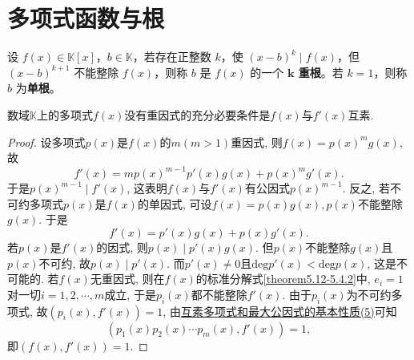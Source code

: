 \documentclass[../../main.tex]{subfiles}%
\begin{document}
\section{多项式函数与根}

\begin{definition}[多项式的重根]\label{definition:多项式的重根}
设 $f(x) \in \mathbb{K}[x]$，$b \in \mathbb{K}$，若存在正整数 $k$，使 $(x - b)^k \mid f(x)$，但 $(x - b)^{k+1}$ 不能整除 $f(x)$，则称 $b$ 是 $f(x)$ 的一个 \textbf{$\boldsymbol{k}$ 重根}。若 $k = 1$，则称 $b$ 为\textbf{单根}。
\end{definition}

\begin{theorem}[多项式没有重因式的充要条件]\label{theorem:多项式没有重因式的充要条件}
数域\(\mathbb{K}\)上的多项式\(f(x)\)没有重因式的充分必要条件是\(f(x)\)与\(f'(x)\)互素.
\end{theorem}
\begin{proof}

设多项式\(p(x)\)是\(f(x)\)的\(m(m > 1)\)重因式, 则\(f(x)=p(x)^mg(x)\), 故
\[
f'(x)=mp(x)^{m - 1}p'(x)g(x)+p(x)^mg'(x).
\]
于是\(p(x)^{m - 1}\mid f'(x)\), 这表明\(f(x)\)与\(f'(x)\)有公因式\(p(x)^{m - 1}\).
反之, 若不可约多项式\(p(x)\)是\(f(x)\)的单因式, 可设\(f(x)=p(x)g(x), p(x)\)不能整除\(g(x)\). 于是
\[
f'(x)=p'(x)g(x)+p(x)g'(x).
\]
若\(p(x)\)是\(f'(x)\)的因式, 则\(p(x)\mid p'(x)g(x)\). 但\(p(x)\)不能整除\(g(x)\)且\(p(x)\)不可约, 故\(p(x)\mid p'(x)\). 而\(p'(x)\neq 0\)且\(\mathrm{deg }p'(x)<\mathrm{deg }p(x)\), 这是不可能的. 若\(f(x)\)无重因式, 则在\(f(x)\)的标准分解式\eqref{theorem5.12-5.4.2}中, \(e_i = 1\)对一切\(i = 1,2,\cdots,m\)成立, 于是\(p_i(x)\)都不能整除\(f'(x)\). 由于\(p_i(x)\)为不可约多项式, 故\((p_i(x),f'(x)) = 1\), 由\hyperref[proposition:互素多项式和最大公因式的基本性质]{互素多项式和最大公因式的基本性质(5)}可知
\[
(p_1(x)p_2(x)\cdots p_m(x),f'(x)) = 1,
\]
即\((f(x),f'(x)) = 1\).

\end{proof}
\end{document}
